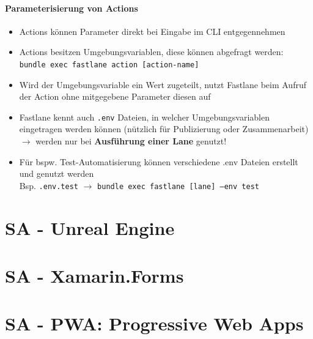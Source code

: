 \documentclass[a4paper]{article}
\begin{document}
		\paragraph{Parameterisierung von Actions}
		\begin{itemize}
			\item Actions können Parameter direkt bei Eingabe im CLI entgegennehmen
			\item Actions besitzen Umgebungsvariablen, diese können abgefragt werden: \\
				\texttt{bundle exec fastlane action [action-name]}
			\item Wird der Umgebungsvariable ein Wert zugeteilt, nutzt Fastlane beim Aufruf der Action ohne mitgegebene Parameter diesen auf
			\item Fastlane kennt auch \texttt{.env} Dateien, in welcher Umgebungsvariablen eingetragen werden können (nützlich für Publizierung oder Zusammenarbeit) $\rightarrow$ werden nur bei \textbf{Ausführung einer Lane} genutzt!
			\item Für bspw. Test-Automatisierung können verschiedene .env Dateien erstellt und genutzt werden \\
				Bsp. \texttt{.env.test} $\rightarrow$ \texttt{bundle exec fastlane [lane] --env test}
		\end{itemize}
	
	\section{SA - Unreal Engine}
	
	
	
	\section{SA - Xamarin.Forms}
	
	
	
	\section{SA - PWA: Progressive Web Apps}
	
\end{document}
